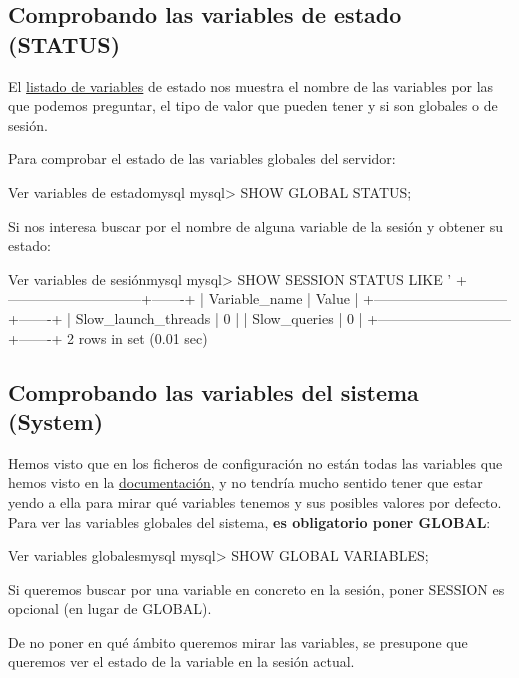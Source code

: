 \subsection{Comprobando las variables de estado (STATUS)}
El \href{https://dev.mysql.com/doc/refman/8.0/en/server-status-variable-reference.html}{listado de variables} de estado nos muestra el nombre de las variables por las que podemos preguntar, el tipo de valor que pueden tener y si son globales o de sesión.

Para comprobar el estado de las variables globales del servidor:

\begin{mycode}{Ver variables de estado}{mysql}{}
mysql> SHOW GLOBAL STATUS;
\end{mycode}

Si nos interesa buscar por el nombre de alguna variable de la sesión y obtener su estado:

\begin{mycode}{Ver variables de sesión}{mysql}{}
mysql> SHOW SESSION STATUS LIKE '%
+-----------------------------+-------+
| Variable_name               | Value |
+-----------------------------+-------+
| Slow_launch_threads         | 0     |
| Slow_queries                | 0     |
+-----------------------------+-------+
2 rows in set (0.01 sec)
\end{mycode}

\subsection{Comprobando las variables del sistema (System)}
Hemos visto que en los ficheros de configuración no están todas las variables que hemos visto en la \href{https://dev.mysql.com/doc/refman/8.0/en/server-option-variable-reference.html}{documentación}, y no tendría mucho sentido tener que estar yendo a ella para mirar qué variables tenemos y sus posibles valores por defecto. Para ver las variables globales del sistema, \textbf{es obligatorio poner GLOBAL}:

\begin{mycode}{Ver variables globales}{mysql}{}
mysql> SHOW GLOBAL VARIABLES;
\end{mycode}

Si queremos buscar por una variable en concreto en la sesión, poner SESSION es opcional (en lugar de GLOBAL).

De no poner en qué ámbito queremos mirar las variables, se presupone que queremos ver el estado de la variable en la sesión actual.

